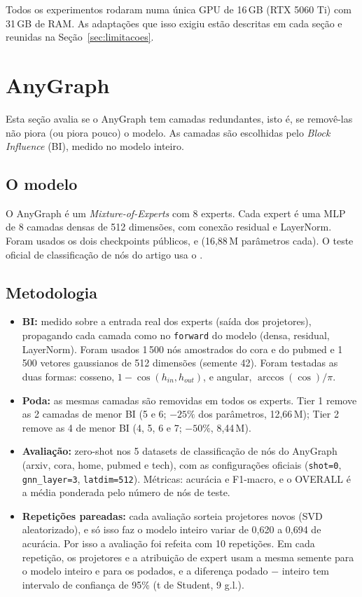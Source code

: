 \documentclass[12pt,a4paper]{article}
\begin{document}
Todos os experimentos rodaram numa única GPU de 16\,GB (RTX 5060 Ti) com 31\,GB de RAM. As adaptações que isso exigiu estão descritas em cada seção e reunidas na Seção~\ref{sec:limitacoes}.

\section{AnyGraph}

Esta seção avalia se o AnyGraph tem camadas redundantes, isto é, se removê-las não piora (ou piora pouco) o modelo. As camadas são escolhidas pelo \emph{Block Influence} (BI), medido no modelo inteiro.

\subsection{O modelo}

O AnyGraph é um \emph{Mixture-of-Experts} com 8 experts. Cada expert é uma MLP de 8 camadas densas de 512 dimensões, com conexão residual e LayerNorm. Foram usados os dois checkpoints públicos,  e  (16,88\,M parâmetros cada). O teste oficial de classificação de nós do artigo usa o .

\subsection{Metodologia}

\begin{itemize}
  \item \textbf{BI:} medido sobre a entrada real dos experts (saída dos projetores), propagando cada camada como no \texttt{forward} do modelo (densa, residual, LayerNorm). Foram usados 1\,500 nós amostrados do cora e do pubmed e 1\,500 vetores gaussianos de 512 dimensões (semente 42). Foram testadas as duas formas: cosseno, $1-\cos(h_{in},h_{out})$, e angular, $\arccos(\cos)/\pi$.
  \item \textbf{Poda:} as mesmas camadas são removidas em todos os experts. Tier 1 remove as 2 camadas de menor BI (5 e 6; $-25\%$ dos parâmetros, 12,66\,M); Tier 2 remove as 4 de menor BI (4, 5, 6 e 7; $-50\%$, 8,44\,M).
  \item \textbf{Avaliação:} zero-shot nos 5 datasets de classificação de nós do AnyGraph (arxiv, cora, home, pubmed e tech), com as configurações oficiais (\texttt{shot=0}, \texttt{gnn\_layer=3}, \texttt{latdim=512}). Métricas: acurácia e F1-macro, e o OVERALL é a média ponderada pelo número de nós de teste.
  \item \textbf{Repetições pareadas:} cada avaliação sorteia projetores novos (SVD aleatorizado), e só isso faz o modelo inteiro variar de 0,620 a 0,694 de acurácia. Por isso a avaliação foi refeita com 10 repetições. Em cada repetição, os projetores e a atribuição de expert usam a mesma semente para o modelo inteiro e para os podados, e a diferença podado $-$ inteiro tem intervalo de confiança de 95\% (t de Student, 9 g.l.).
\end{itemize}
\end{document}
